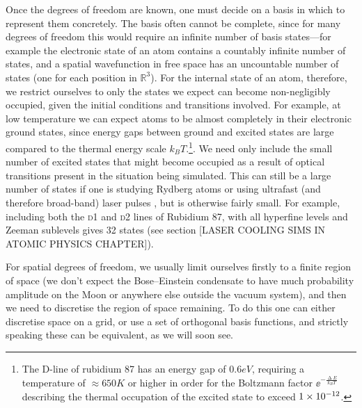 Once the degrees of freedom are known, one must decide on a basis in which to represent them concretely. The basis often cannot be complete, since for many degrees of freedom this would require an infinite number of basis states---for example the electronic state of an atom contains a countably infinite number of states, and a spatial wavefunction in free space has an uncountable number of states (one for each position in $\mathbb{R}^3$). For the internal state of an atom, therefore, we restrict ourselves to only the states we expect can become non-negligibly occupied, given the initial conditions and transitions involved. For example, at low temperature we can expect atoms to be almost completely in their electronic ground states, since energy gaps between ground and excited states are large compared to the thermal energy scale $k_B T$.\footnote{The D-line of rubidium 87 has an energy gap of $0.6\unit{eV}$, requiring a temperature of $\approx 650\unit{K}$ or higher in order for the Boltzmann factor $\ee^{-\frac{\upDelta E}{k_B T}}$ describing the thermal occupation of the excited state to exceed $1\times 10^{-12}$.}. We need only include the small number of excited states that might become occupied as a result of optical transitions present in the situation being simulated. This can still be a large number of states if one is studying Rydberg atoms \cite{saffman_quantum_2010, urban_observation_2009} or using ultrafast (and therefore broad-band) laser pulses \cite{blinov_broadband_2006, mcculloch_high-coherence_2013, brabec_intense_2000}, but is otherwise fairly small. For example, including both the \textsc{d1} and \textsc{d2} lines of Rubidium 87, with all hyperfine levels and Zeeman sublevels gives 32 states (see section [LASER COOLING SIMS IN ATOMIC PHYSICS CHAPTER]).

For spatial degrees of freedom, we usually limit ourselves firstly to a finite region of space (we don't expect the Bose--Einstein condensate to have much probability amplitude on the Moon or anywhere else outside the vacuum system), and then we need to discretise the region of space remaining. To do this one can either discretise space on a grid, or use a set of orthogonal basis functions, and strictly speaking these can be equivalent, as we will soon see.

